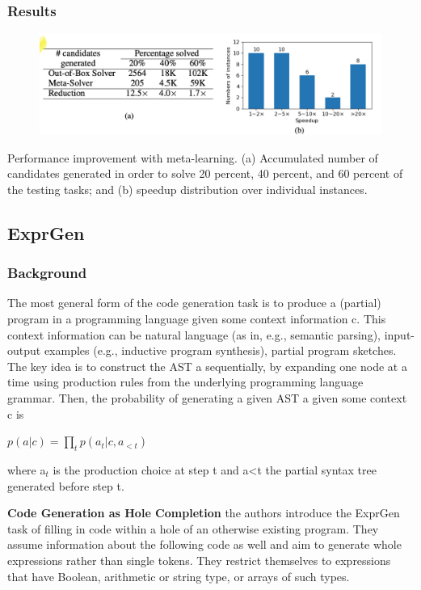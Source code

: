 \documentclass{article}
\begin{document}
\subsubsection{Results}
\begin{figure}[ht]
\vskip 0.2in
\begin{center}
\centerline{\includegraphics[width=\columnwidth]{Images/Synthesis1-3.png}}
\label{icml-historical}
\end{center}
\vskip -0.2in
\end{figure}
Performance improvement with meta-learning. (a) Accumulated number of candidates generated in order to solve 20 percent, 40 percent, and 60 percent of the testing tasks; and (b) speedup distribution over individual instances.
\subsection{ExprGen}
\subsubsection{Background}
The most general form of the code generation task is to produce a (partial) program in a programming language given some context information c. This context information can be natural language (as in, e.g., semantic parsing), input-output examples (e.g., inductive program synthesis), partial program sketches. The key idea is to construct the AST a sequentially, by expanding one node at a time using production rules from the underlying programming language grammar.  Then, the probability of generating a given AST a given some context c is

\begin{math}
p(a|c) = \prod_t p(a_t|c,a_{<t})
\end{math}

where a$_t$ is the production choice at step t and a<t the partial syntax tree generated before step t.

\textbf{Code Generation as Hole Completion} the authors introduce the ExprGen task of filling in code within a hole of an otherwise existing program. They assume information about the following code as well and aim to generate whole expressions rather than single tokens. They restrict themselves to expressions that have Boolean, arithmetic or string type, or arrays of such types.
\end{document}
